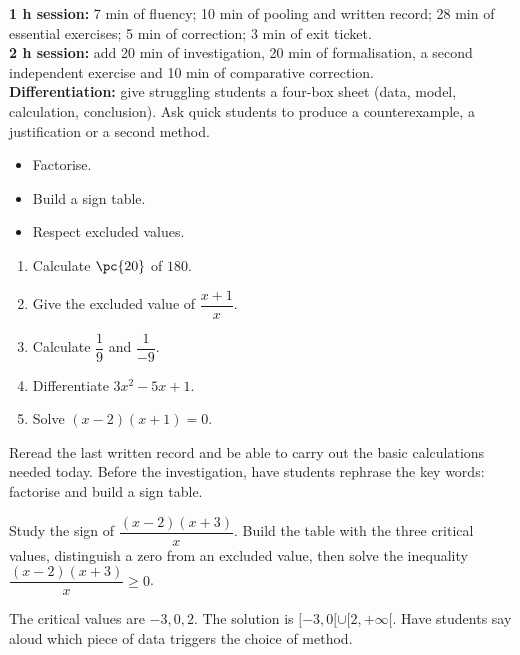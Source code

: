 \ifmxteacher
\begin{method}
\textbf{1 h session:} 7 min of fluency; 10 min of pooling and written record; 28 min of essential exercises; 5 min of correction; 3 min of exit ticket.\\
\textbf{2 h session:} add 20 min of investigation, 20 min of formalisation, a second independent exercise and 10 min of comparative correction.\\
\textbf{Differentiation:} give struggling students a four-box sheet (data, model, calculation, conclusion). Ask quick students to produce a counterexample, a justification or a second method.
\end{method}
\fi
{}
\begin{objectives}\begin{itemize}\item Factorise.\item Build a sign table.\item Respect excluded values.\end{itemize}\end{objectives}
\begin{fluency}\begin{enumerate}\item Calculate $\pc{20}$ of $180$. \item Give the excluded value of $\dfrac{x+1}{x}$. \item Calculate $\dfrac1{9}$ and $\dfrac1{-9}$. \item Differentiate $3x^2-5x+1$. \item Solve $(x-2)(x+1)=0$. \end{enumerate}\end{fluency}
\begin{prerequisites}Reread the last written record and be able to carry out the basic calculations needed today. Before the investigation, have students rephrase the key words: factorise and build a sign table.\end{prerequisites}

\begin{activity}
Study the sign of $\dfrac{(x-2)(x+3)}x$. Build the table with the three critical values, distinguish a zero from an excluded value, then solve the inequality $\dfrac{(x-2)(x+3)}x\geq0$.

\end{activity}
\begin{solution}The critical values are $-3,0,2$. The solution is $[-3,0[\cup[2,+\infty[$. Have students say aloud which piece of data triggers the choice of method.\end{solution}


